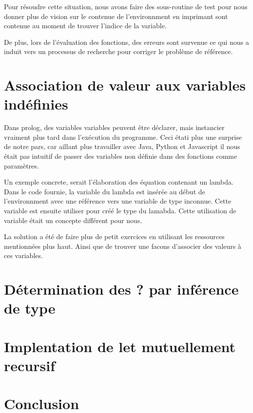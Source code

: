 \documentclass[12pt, letterpaper]{article}
\begin{document}
Pour résoudre cette situation, nous avons faire des sous-routine de test 
pour nous donner plus de vision sur le contenue de l'environnment en imprimant
sont contenue au moment de trouver l'indice de la variable.

De plus, lors de l'évaluation des fonctions, des erreurs sont survenue ce qui
nous a induit vers un processus de recherche pour corriger le problème de 
référence.

\section*{Association de valeur aux variables indéfinies}

Dans prolog, des variables variables peuvent être déclarer, mais instancier 
vraiment plus tard dans l'exécution du programme. Ceci étati plus une surprise 
de notre pars, car aillant plus travailler avec Java, Python et Javascript
il nous était pas intuitif de passer des variables non définie dans des fonctions
comme paramètres. 

Un exemple concrete, serait l'élaboration des équation contenant un lambda.
Dans le code fournie, la variable du lambda est insérée au début de l'environnment
avec une référence vers une variable de type inconnue. Cette variable est ensuite 
utiliser pour créé le type du lamabda. Cette utilisation de variable était un
concepte différent pour nous.

La solution a été de faire plus de petit exercices en utilisant les ressources 
mentionnées plus haut. Ainsi que de trouver une facons d'associer des valeurs 
à ces variables.

\section*{Détermination des ? par inférence de type}

\section*{Implentation de let mutuellement recursif}

\section*{Conclusion}
\end{document}
